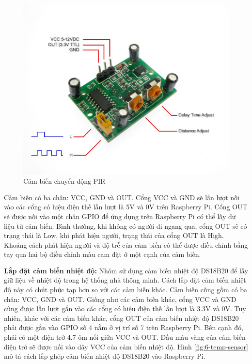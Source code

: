 \documentclass[11pt,a4paper,oneside]{book}
\begin{document}
\begin{figure}[h]
  \centering
     \includegraphics[scale=0.2]{6-pir-sensor}
  \caption{Cảm biến chuyển động PIR}\label{fig:6-pir-sensor}
\end{figure}

Cảm biến có ba chân: VCC, GND và OUT. Cổng VCC và GND sẽ lần lượt nối vào các cổng có hiệu điện thế lần lượt là 5V và 0V trên Raspberry Pi. Cổng OUT sẽ được nối vào một chân GPIO để ứng dụng trên Raspberry Pi có thể lấy dữ liệu từ cảm biến. Bình thường, khi không có người đi ngang qua, cổng OUT sẽ có trạng thái là Low, khi phát hiện người, trạng thái của cổng OUT là High. Khoảng cách phát hiện người và độ trễ của cảm biến có thể được điều chỉnh bằng tay qua hai bộ điều chỉnh màu cam đặt ở một cạnh của cảm biến.

\textbf{Lắp đặt cảm biến nhiệt độ:} Nhóm sử dụng cảm biến nhiệt độ DS18B20 để lấy giữ liệu về nhiệt độ trong hệ thống nhà thông minh. Cách lắp đặt cảm biến nhiệt độ này có chút phức tạp hơn so với các cảm biến khác. Cảm biến cũng gồm có ba chân: VCC, GND và OUT. Giống như các cảm biến khác, cổng VCC và GND cũng được lần lượt gắn vào các cổng có hiệu điện thế lần lượt là 3.3V và 0V. Tuy nhiên, khác với các cảm biến khác, cổng OUT của cảm biến nhiệt độ DS18B20 phải được gắn vào GPIO số 4 nằm ở vị trí số 7 trên Raspberry Pi. Bên cạnh đó, phải có một điện trở 4.7 ôm nối giữa VCC và OUT. Đầu màu vàng của cảm biến điện trở sẽ được nối vào dây VCC của cảm biến nhiệt độ. Hình \ref{fig:6-temp-sensor} mô tả cách lắp ghép cảm biến nhiệt độ DS18B20 vào Raspberry Pi.
\end{document}
